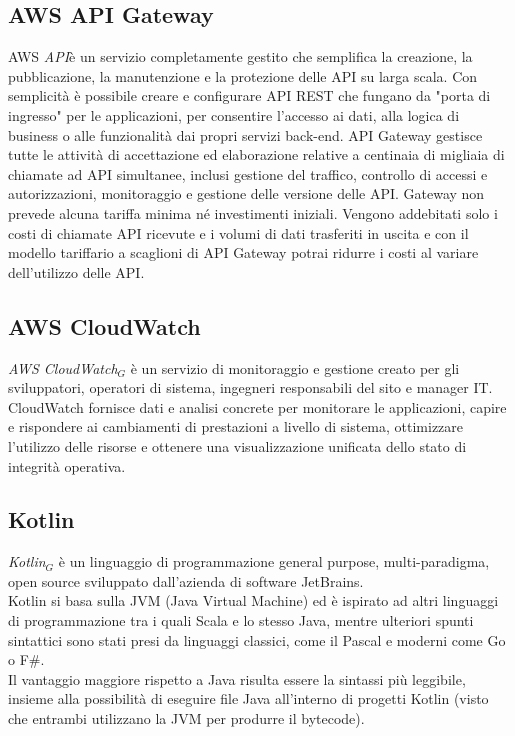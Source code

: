 \subsection{AWS API Gateway}
AWS \textit{API}è un servizio completamente gestito che semplifica la creazione, la pubblicazione, la manutenzione e la protezione delle API su larga scala. Con semplicità è possibile creare e configurare API REST che fungano da "porta di ingresso" per le applicazioni, per consentire l'accesso ai dati, alla logica di business o alle funzionalità dai propri servizi back-end. API Gateway gestisce tutte le attività di accettazione ed elaborazione relative a centinaia di migliaia di chiamate ad API simultanee, inclusi gestione del traffico, controllo di accessi e autorizzazioni, monitoraggio e gestione delle versione delle API. Gateway non prevede alcuna tariffa minima né investimenti iniziali. Vengono addebitati solo i costi di chiamate API ricevute e i volumi di dati trasferiti in uscita e con il modello tariffario a scaglioni di API Gateway potrai ridurre i costi al variare dell'utilizzo delle API.
\subsection{AWS CloudWatch}
\textit{AWS CloudWatch$_{G}$} è un servizio di monitoraggio e gestione creato per gli sviluppatori, operatori di sistema, ingegneri responsabili del sito e manager IT. CloudWatch fornisce dati e analisi concrete per monitorare le applicazioni, capire e rispondere ai cambiamenti di prestazioni a livello di sistema, ottimizzare l'utilizzo delle risorse e ottenere una visualizzazione unificata dello stato di integrità operativa. 
\subsection{Kotlin}
\textit{Kotlin$_{G}$} è un linguaggio di programmazione general purpose, multi-paradigma, open source sviluppato dall'azienda di software JetBrains.\\
Kotlin si basa sulla JVM (Java Virtual Machine) ed è ispirato ad altri linguaggi di programmazione tra i quali Scala e lo stesso Java, mentre ulteriori spunti sintattici sono stati presi da linguaggi classici, come il Pascal e moderni come Go o F\#.\\
Il vantaggio maggiore rispetto a Java risulta essere la sintassi più leggibile, insieme alla possibilità di eseguire file Java all'interno di progetti Kotlin (visto che entrambi utilizzano la JVM per produrre il bytecode).

